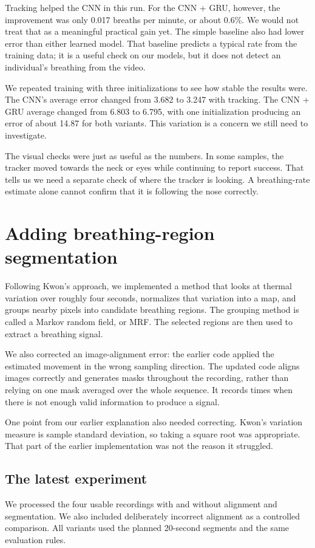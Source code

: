 \documentclass[11pt,a4paper]{article}
\begin{document}
Tracking helped the CNN in this run. For the CNN + GRU, however, the improvement was only 0.017 breaths per minute, or about 0.6\%. We would not treat that as a meaningful practical gain yet. The simple baseline also had lower error than either learned model. That baseline predicts a typical rate from the training data; it is a useful check on our models, but it does not detect an individual's breathing from the video.

We repeated training with three initializations to see how stable the results were. The CNN's average error changed from 3.682 to 3.247 with tracking. The CNN + GRU average changed from 6.803 to 6.795, with one initialization producing an error of about 14.87 for both variants. This variation is a concern we still need to investigate.

The visual checks were just as useful as the numbers. In some samples, the tracker moved towards the neck or eyes while continuing to report success. That tells us we need a separate check of where the tracker is looking. A breathing-rate estimate alone cannot confirm that it is following the nose correctly.

\section{Adding breathing-region segmentation}
Following Kwon's approach, we implemented a method that looks at thermal variation over roughly four seconds, normalizes that variation into a map, and groups nearby pixels into candidate breathing regions. The grouping method is called a Markov random field, or MRF. The selected regions are then used to extract a breathing signal.

We also corrected an image-alignment error: the earlier code applied the estimated movement in the wrong sampling direction. The updated code aligns images correctly and generates masks throughout the recording, rather than relying on one mask averaged over the whole sequence. It records times when there is not enough valid information to produce a signal.

One point from our earlier explanation also needed correcting. Kwon's variation measure is sample standard deviation, so taking a square root was appropriate. That part of the earlier implementation was not the reason it struggled.

\subsection*{The latest experiment}
We processed the four usable recordings with and without alignment and segmentation. We also included deliberately incorrect alignment as a controlled comparison. All variants used the planned 20-second segments and the same evaluation rules.
\end{document}
